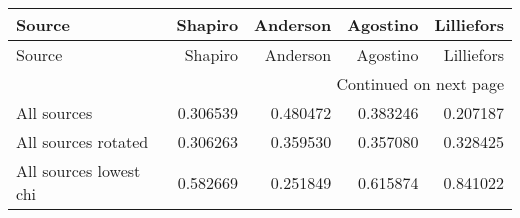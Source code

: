 \begin{longtable}{lrrrr}
\toprule
                Source &  Shapiro &  Anderson &  Agostino &  Lilliefors \\
\midrule
\endfirsthead

\toprule
                Source &  Shapiro &  Anderson &  Agostino &  Lilliefors \\
\midrule
\endhead
\midrule
\multicolumn{5}{r}{{Continued on next page}} \\
\midrule
\endfoot

\bottomrule
\endlastfoot
           All sources & 0.306539 &  0.480472 &  0.383246 &    0.207187 \\
   All sources rotated & 0.306263 &  0.359530 &  0.357080 &    0.328425 \\
All sources lowest chi & 0.582669 &  0.251849 &  0.615874 &    0.841022 \\
\end{longtable}
